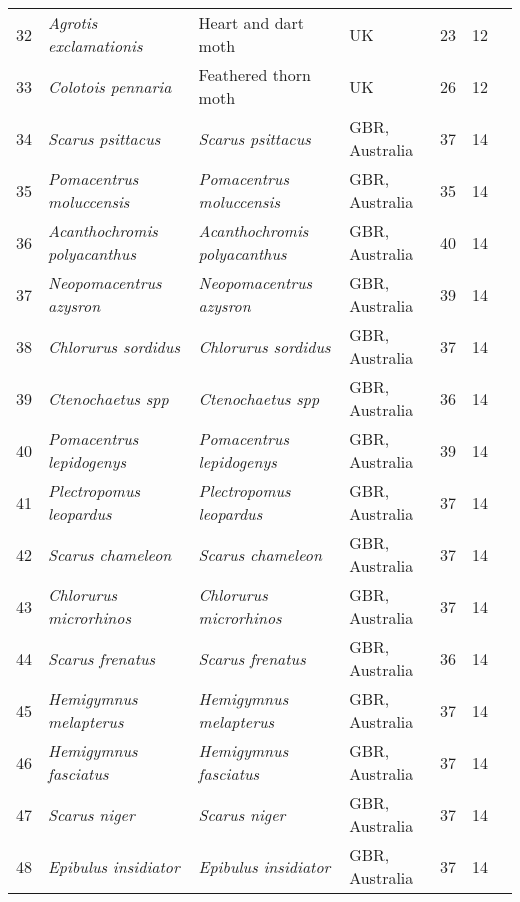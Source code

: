 \begin{table}[ht]
\begin{center}
{\begin{tabular}{rlllrrl}
   32 & \textit{Agrotis exclamationis} & Heart and dart moth & UK &  23 &  12 & \citep{conrad2004} \\ 
   33 & \textit{Colotois pennaria} & Feathered thorn moth & UK &  26 &  12 & \citep{conrad2004} \\ 
   34 & \textit{Scarus psittacus} & \textit{Scarus psittacus} & GBR, Australia &  37 &  14 & \citep{sweatman2008} \\ 
   35 & \textit{Pomacentrus moluccensis} & \textit{Pomacentrus moluccensis} & GBR, Australia &  35 &  14 & \citep{sweatman2008} \\ 
   36 & \textit{Acanthochromis polyacanthus} & \textit{Acanthochromis polyacanthus} & GBR, Australia &  40 &  14 & \citep{sweatman2008} \\ 
   37 & \textit{Neopomacentrus azysron} & \textit{Neopomacentrus azysron} & GBR, Australia &  39 &  14 & \citep{sweatman2008} \\ 
   38 & \textit{Chlorurus sordidus} & \textit{Chlorurus sordidus} & GBR, Australia &  37 &  14 & \citep{sweatman2008} \\ 
   39 & \textit{Ctenochaetus spp} & \textit{Ctenochaetus spp} & GBR, Australia &  36 &  14 & \citep{sweatman2008} \\ 
   40 & \textit{Pomacentrus lepidogenys} & \textit{Pomacentrus lepidogenys} & GBR, Australia &  39 &  14 & \citep{sweatman2008} \\ 
   41 & \textit{Plectropomus leopardus} & \textit{Plectropomus leopardus} & GBR, Australia &  37 &  14 & \citep{sweatman2008} \\ 
   42 & \textit{Scarus chameleon} & \textit{Scarus chameleon} & GBR, Australia &  37 &  14 & \citep{sweatman2008} \\ 
   43 & \textit{Chlorurus microrhinos} & \textit{Chlorurus microrhinos} & GBR, Australia &  37 &  14 & \citep{sweatman2008} \\ 
   44 & \textit{Scarus frenatus} & \textit{Scarus frenatus} & GBR, Australia &  36 &  14 & \citep{sweatman2008} \\ 
   45 & \textit{Hemigymnus melapterus} & \textit{Hemigymnus melapterus} & GBR, Australia &  37 &  14 & \citep{sweatman2008} \\ 
   46 & \textit{Hemigymnus fasciatus} & \textit{Hemigymnus fasciatus} & GBR, Australia &  37 &  14 & \citep{sweatman2008} \\ 
   47 & \textit{Scarus niger} & \textit{Scarus niger} & GBR, Australia &  37 &  14 & \citep{sweatman2008} \\ 
   48 & \textit{Epibulus insidiator} & \textit{Epibulus insidiator} & GBR, Australia &  37 &  14 & \citep{sweatman2008} \\ 

\end{tabular}}
\end{center}
\end{table}
